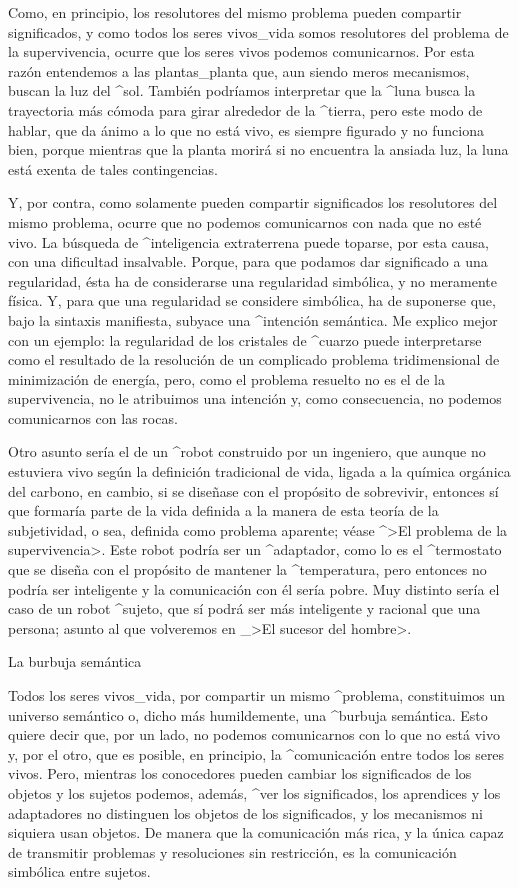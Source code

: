 Como, en principio, los resolutores del mismo problema pueden compartir
significados, y como todos los seres vivos_{vida} somos resolutores del
problema de la supervivencia, ocurre que los seres vivos podemos
comunicarnos. Por esta razón entendemos a las plantas_{planta} que, aun
siendo meros mecanismos, buscan la luz del ^{sol}. También podríamos
interpretar que la ^{luna} busca la trayectoria más cómoda para girar
alrededor de la ^{tierra}, pero este modo de hablar, que da ánimo a lo
que no está vivo, es siempre figurado y no funciona bien, porque
mientras que la planta morirá si no encuentra la ansiada luz, la luna
está exenta de tales contingencias.


Y, por contra, como solamente pueden compartir significados los
resolutores del mismo problema, ocurre que no podemos comunicarnos con
nada que no esté vivo. La búsqueda de ^{inteligencia} extraterrena puede
toparse, por esta causa, con una dificultad insalvable. Porque, para que
podamos dar significado a una regularidad, ésta ha de considerarse una
regularidad simbólica, y no meramente física. Y, para que una
regularidad se considere simbólica, ha de suponerse que, bajo la
sintaxis manifiesta, subyace una ^{intención} semántica. Me explico
mejor con un ejemplo: la regularidad de los cristales de ^{cuarzo} puede
interpretarse como el resultado de la resolución de un complicado
problema tridimensional de minimización de energía, pero, como el
problema resuelto no es el de la supervivencia, no le atribuimos una
intención y, como consecuencia, no podemos comunicarnos con las rocas.

Otro asunto sería el de un ^{robot} construido por un ingeniero, que
aunque no estuviera vivo según la definición tradicional de vida, ligada
a la química orgánica del carbono, en cambio, si se diseñase con el
propósito de sobrevivir, entonces sí que formaría parte de la vida
definida a la manera de esta teoría de la subjetividad, o sea, definida
como problema aparente; véase ^>El problema de la supervivencia>. Este
robot podría ser un ^{adaptador}, como lo es el ^{termostato} que se
diseña con el propósito de mantener la ^{temperatura}, pero entonces no
podría ser inteligente y la comunicación con él sería pobre. Muy
distinto sería el caso de un robot ^{sujeto}, que sí podrá ser más
inteligente y racional que una persona; asunto al que volveremos en _>El
sucesor del hombre>.


\Section La burbuja semántica

Todos los seres vivos_{vida}, por compartir un mismo ^{problema},
constituimos un universo semántico o, dicho más humildemente, una
^{burbuja semántica}. Esto quiere decir que, por un lado, no podemos
comunicarnos con lo que no está vivo y, por el otro, que es posible, en
principio, la ^{comunicación} entre todos los seres vivos. Pero,
mientras los conocedores pueden cambiar los significados de los objetos
y los sujetos podemos, además, ^{ver} los significados, los aprendices y
los adaptadores no distinguen los objetos de los significados, y los
mecanismos ni siquiera usan objetos. De manera que la comunicación más
rica, y la única capaz de transmitir problemas y resoluciones sin
restricción, es la comunicación simbólica entre sujetos.


